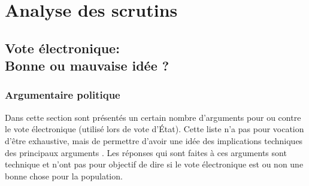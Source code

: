 \documentclass[../report]{subfiles}
\begin{document}
\newcommand\tabcritere[8]{
  \begin{center}
    \begin{tabular}{p{8em}|c|p{28em}}
      \hline
      Critère & Évaluation & Raison \\
      \hline
      \hline
      Avis des perdants & #1 & #2 \\
      \hline
      Indépendance aux petits candidats & #3 & #4 \\
      \hline
      Quasi unanimité du vote & #5 & #6 \\
      \hline
      Manipulabilité & #7 & #8 \\
      \hline
    \end{tabular}
  \end{center}
}



\part{Analyse des scrutins}

\chapter[Vote électronique: bonne ou mauvaise idée ?]{Vote électronique:\\Bonne ou mauvaise idée ?}

\section{Argumentaire politique}

Dans cette section sont présentés un certain nombre d'arguments pour ou contre le vote 
électronique (utilisé lors de vote d'État). 
Cette liste n'a pas pour vocation d'être exhaustive, mais de permettre d'avoir une idée
des implications techniques des principaux arguments \cite{olivier_elections_2022,jaberg_10_nodate}.
Les réponses qui sont faites à ces arguments sont technique et n'ont pas pour objectif de dire si 
le vote électronique est ou non une bonne chose pour la population.
\end{document}
